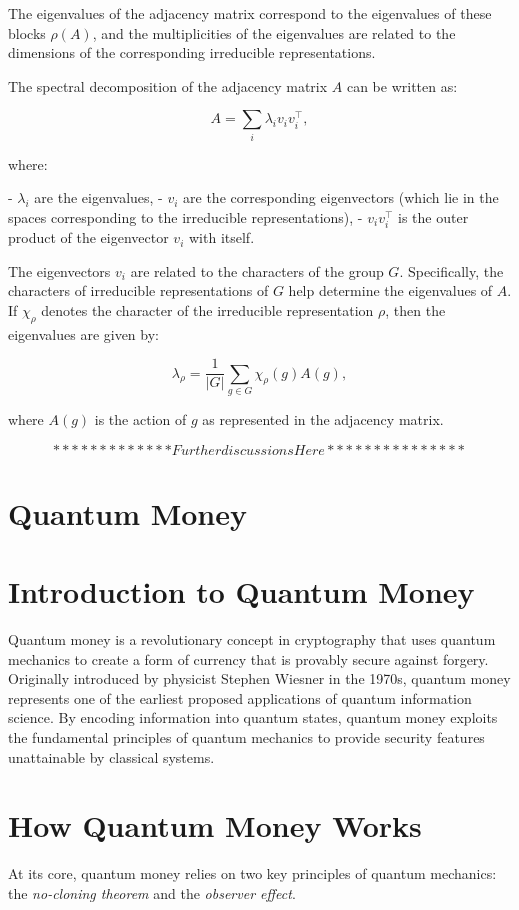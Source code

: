 \documentclass[11pt]{article}
\theoremstyle{definition}
\begin{document}
The eigenvalues of the adjacency matrix correspond to the eigenvalues of these blocks $\rho(A)$, and the multiplicities of the eigenvalues are related to the dimensions of the corresponding irreducible representations.

The spectral decomposition of the adjacency matrix $A$ can be written as:

\[
A = \sum_{i} \lambda_{i} v_{i} v_{i}^{\top},
\]

where:

- $\lambda_{i}$ are the eigenvalues,
- $v_{i}$ are the corresponding eigenvectors (which lie in the spaces corresponding to the irreducible representations),
- $v_{i} v_{i}^{\top}$ is the outer product of the eigenvector $v_{i}$ with itself.

The eigenvectors $v_{i}$ are related to the characters of the group $G$. Specifically, the characters of irreducible representations of $G$ help determine the eigenvalues of $A$. If $\chi_{\rho}$ denotes the character of the irreducible representation $\rho$, then the eigenvalues are given by:

\[
\lambda_{\rho} = \frac{1}{|G|} \sum_{g \in G} \chi_{\rho}(g) A(g),
\]

where $A(g)$ is the action of $g$ as represented in the adjacency matrix.


\[
*************Further discussions Here***************
\]



\section{Quantum Money}


\section*{Introduction to Quantum Money}
Quantum money is a revolutionary concept in cryptography that uses quantum mechanics to create a form of currency that is provably secure against forgery. Originally introduced by physicist Stephen Wiesner in the 1970s, quantum money represents one of the earliest proposed applications of quantum information science. By encoding information into quantum states, quantum money exploits the fundamental principles of quantum mechanics to provide security features unattainable by classical systems.

\section*{How Quantum Money Works}
At its core, quantum money relies on two key principles of quantum mechanics: the \textit{no-cloning theorem} and the \textit{observer effect}.
\end{document}
